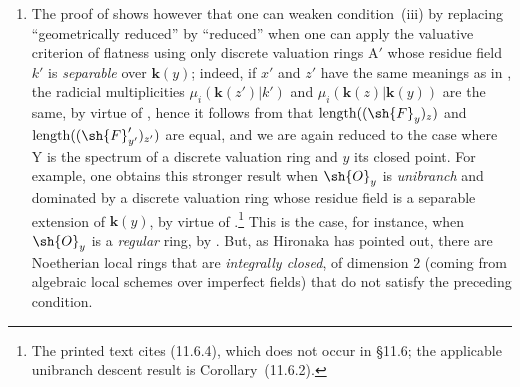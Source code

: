 \begin{remarks}[15.2.4]
\begin{enumerate}[label=(\roman*)]
To construct the rings $\mathrm{A}$ and $\mathrm{A}'$, let us start from an imperfect field $k$ of characteristic $p>0$; let $\mathrm{K}_0=k((\mathrm{T}))$ be the field of formal Laurent series over $k$, and let $\mathrm{A}_0$ be its valuation ring for the discrete valuation given by the order of a formal Laurent series; the residue field of $\mathrm{A}_0$ is thus $k$.
Let $\alpha$ be an element of $k$ that is not a $p$-th power, and let us take $k'=k(\alpha^{1/p})$; $\mathrm{K}=k'((\mathrm{T}))$ is then a finite radicial extension of $\mathrm{K}_0$, and $\mathrm{A}'=\mathrm{A}_0\otimes_k k'$ is the discrete valuation ring for $\mathrm{K}$.
If $\mathfrak{m}'$ is the maximal ideal of $\mathrm{A}'$, conditions~$1)$ and $2)$ are satisfied by taking $\mathrm{A}=\mathrm{A}_0+\mathfrak{m}'$: indeed, as $\mathrm{A}_0$ is Noetherian and $\mathrm{A}'$ is an $\mathrm{A}_0$-module of finite type, $\mathrm{A}$ is a finite $\mathrm{A}_0$-algebra, hence a Noetherian ring; since $\mathrm{A}'$ is finite over $\mathrm{A}$, $\mathfrak{m}'$ is the only maximal ideal of $\mathrm{A}$, which is thus a complete local ring, evidently of dimension $1$ (being finite over $\mathrm{A}_0$) and geometrically unibranch, since $\mathrm{A}'$ is integrally closed and has the same field of fractions $\mathrm{K}$ as $\mathrm{A}$.
  \item The proof of  shows however that one can weaken condition~(iii) by replacing ``geometrically reduced'' by ``reduced'' when one can apply the valuative criterion of flatness  using only discrete valuation rings $\mathrm{A}'$ whose residue field $k'$ is \emph{separable} over $\mathbf{k}(y)$; indeed, if $x'$ and $z'$ have the same meanings as in , the radicial multiplicities $\mu_i(\mathbf{k}(z')|k')$ and $\mu_i(\mathbf{k}(z)|\mathbf{k}(y))$ are the same, by virtue of , hence it follows from  that $\operatorname{length}((\sh{F}_y)_z)$ and $\operatorname{length}((\sh{F}_{y'}')_{z'})$ are equal, and we are again reduced to the case where $\mathrm{Y}$ is the spectrum of a discrete valuation ring and $y$ its closed point.
For example, one obtains this stronger result when $\sh{O}_y$ is \emph{unibranch} and dominated by a discrete valuation ring whose residue field is a separable extension of $\mathbf{k}(y)$, by virtue of .\footnote{The printed text cites (11.6.4), which does not occur in \S11.6; the applicable unibranch descent result is Corollary~(11.6.2).}
This is the case, for instance, when $\sh{O}_y$ is a \emph{regular} ring, by .
But, as Hironaka has pointed out, there are Noetherian local rings that are \emph{integrally closed}, of dimension $2$ (coming from algebraic local schemes over imperfect fields) that do not satisfy the preceding condition.
\end{enumerate}
\end{remarks}

